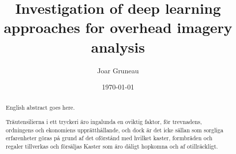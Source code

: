 \documentclass{kththesis}
\title{Investigation of deep learning approaches for overhead imagery analysis}
\author{Joar Gruneau}
\date{\today}
\begin{document}
\frontmatter

\titlepage

\begin{abstract}
  English abstract goes here.

  \blindtext
\end{abstract}


\begin{otherlanguage}{swedish}
  \begin{abstract}
    Träutensilierna i ett tryckeri äro ingalunda en oviktig faktor,
    för trevnadens, ordningens och ekonomiens upprätthållande, och
    dock är det icke sällan som sorgliga erfarenheter göras på grund
    af det oförstånd med hvilket kaster, formbräden och regaler
    tillverkas och försäljas Kaster som äro dåligt hopkomna och af
    otillräckligt.
  \end{abstract}
\end{otherlanguage}


\tableofcontents


\mainmatter
\end{document}
